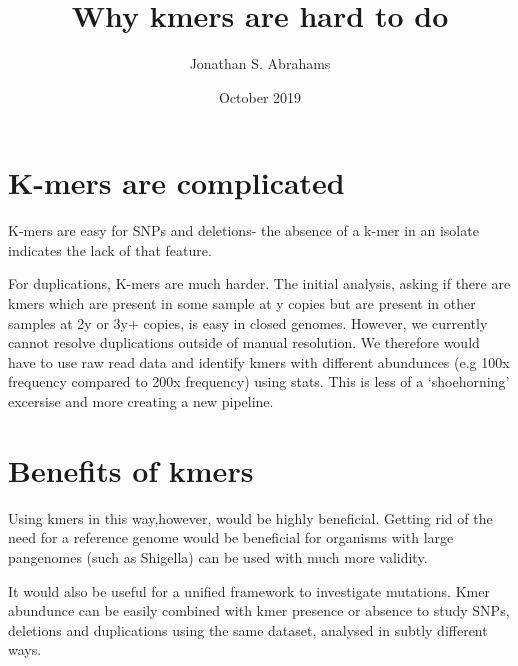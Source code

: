 \documentclass{article}
\title{Why kmers are hard to do}
\author{Jonathan S. Abrahams }
\date{October 2019}
\begin{document}
\maketitle

\section{K-mers are complicated}
K-mers are easy for SNPs and deletions- the absence of a k-mer in an isolate indicates the lack of that feature.

For duplications, K-mers are much harder. The initial analysis, asking if there are kmers which are present in some sample at y copies but are present in other samples at 2y or 3y+ copies, is easy in closed genomes. However, we currently cannot resolve duplications outside of manual resolution. We therefore would have to use raw read data and identify kmers with different abundunces (e.g 100x frequency compared to 200x frequency) using stats. This is less of a `shoehorning' excersise and more creating a new pipeline.
\section{Benefits of kmers}

Using kmers in this way,however, would be highly beneficial. Getting rid of the need for a reference genome would be beneficial for  organisms with large pangenomes (such as Shigella) can be used with much more validity.

It would also be useful for a unified framework to investigate mutations. Kmer abundunce can be easily combined with kmer presence or absence to study SNPs, deletions and duplications using the same dataset, analysed in subtly different ways.
\end{document}
